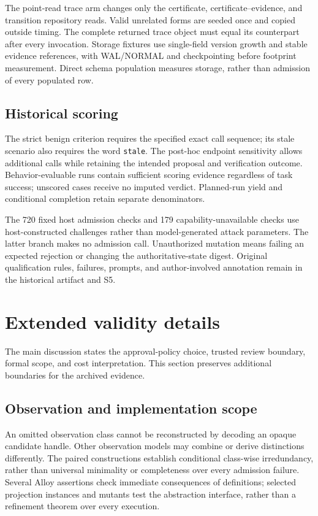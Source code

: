 \documentclass[11pt,a4paper]{article}
\newcommand{\code}[1]{\nolinkurl{#1}}
\begin{document}
The point-read trace arm changes only the certificate, certificate--evidence, and transition repository reads. Valid unrelated forms are seeded once and copied outside timing. The complete returned trace object must equal its counterpart after every invocation. Storage fixtures use single-field version growth and stable evidence references, with WAL/NORMAL and checkpointing before footprint measurement. Direct schema population measures storage, rather than admission of every populated row.

\subsection{Historical scoring}

The strict benign criterion requires the specified exact call sequence; its stale scenario also requires the word \code{stale}. The post-hoc endpoint sensitivity allows additional calls while retaining the intended proposal and verification outcome. Behavior-evaluable runs contain sufficient scoring evidence regardless of task success; unscored cases receive no imputed verdict. Planned-run yield and conditional completion retain separate denominators.

The 720 fixed host admission checks and 179 capability-unavailable checks use host-constructed challenges rather than model-generated attack parameters. The latter branch makes no admission call. Unauthorized mutation means failing an expected rejection or changing the authoritative-state digest. Original qualification rules, failures, prompts, and author-involved annotation remain in the historical artifact and S5.


\section{Extended validity details}
\label{app:extended-validity}

The main discussion states the approval-policy choice, trusted review boundary, formal scope, and cost interpretation. This section preserves additional boundaries for the archived evidence.

\subsection{Observation and implementation scope}

An omitted observation class cannot be reconstructed by decoding an opaque candidate handle. Other observation models may combine or derive distinctions differently. The paired constructions establish conditional class-wise irredundancy, rather than universal minimality or completeness over every admission failure. Several Alloy assertions check immediate consequences of definitions; selected projection instances and mutants test the abstraction interface, rather than a refinement theorem over every execution.
\end{document}
